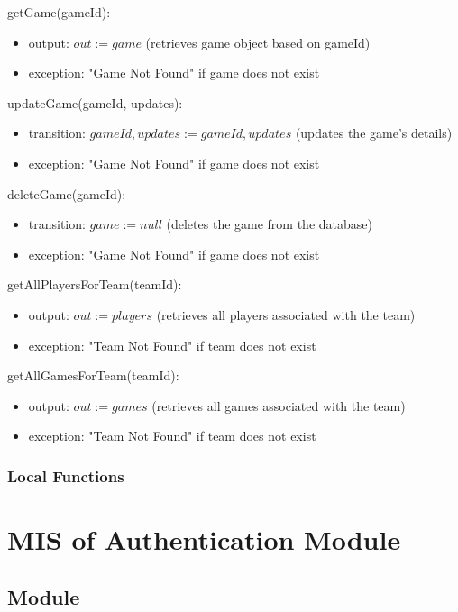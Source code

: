 \documentclass[12pt, titlepage]{article}
\begin{document}
\noindent getGame(gameId):
\begin{itemize}
\item output: $out := game$ (retrieves game object based on gameId)
\item exception: "Game Not Found" if game does not exist
\end{itemize}

\noindent updateGame(gameId, updates):
\begin{itemize}
\item transition: $gameId, updates := gameId, updates$ (updates the game's details)
\item exception: "Game Not Found" if game does not exist
\end{itemize}

\noindent deleteGame(gameId):
\begin{itemize}
\item transition: $game := null$ (deletes the game from the database)
\item exception: "Game Not Found" if game does not exist
\end{itemize}

\noindent getAllPlayersForTeam(teamId):
\begin{itemize}
\item output: $out := players$ (retrieves all players associated with the team)
\item exception: "Team Not Found" if team does not exist
\end{itemize}

\noindent getAllGamesForTeam(teamId):
\begin{itemize}
\item output: $out := games$ (retrieves all games associated with the team)
\item exception: "Team Not Found" if team does not exist
\end{itemize}

\subsubsection{Local Functions}

\newpage

\section{MIS of Authentication Module} \label{Auth}

\subsection{Module}
\end{document}
